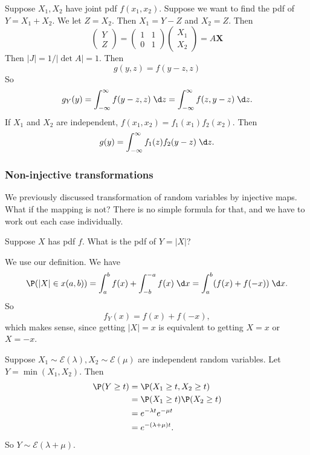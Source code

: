 \documentclass[a4paper]{article}
\begin{document}
\begin{eg}
  Suppose $X_1, X_2$ have joint pdf $f(x_1,x_2)$. Suppose we want to find the pdf of $Y = X_1 + X_2$. We let $Z = X_2$. Then $X_1 = Y - Z$ and $X_2 = Z$. Then
  \[
    \begin{pmatrix}
      Y\\
      Z
    \end{pmatrix} =
    \begin{pmatrix}
      1 & 1 \\
      0 & 1
    \end{pmatrix}
    \begin{pmatrix}
      X_1\\
      X_2
    \end{pmatrix}
    = A\mathbf{X}
  \]
  Then $|J| = 1/|\det A| = 1$. Then
  \[
    g(y, z) = f(y - z, z)
  \]
  So
  \[
    g_Y(y) = \int_{-\infty}^\infty f(y - z, z)\;\d z = \int_{-\infty}^\infty f(z, y - z)\;\d z.
  \]
  If $X_1$ and $X_2$ are independent, $f(x_1, x_2) = f_1(x_1) f_2(x_2)$. Then
  \[
    g(y) = \int_{-\infty}^\infty f_1(z) f_2(y - z)\;\d z.
  \]
\end{eg}

\subsubsection*{Non-injective transformations}
We previously discussed transformation of random variables by injective maps. What if the mapping is not? There is no simple formula for that, and we have to work out each case individually.

\begin{eg}
  Suppose $X$ has pdf $f$. What is the pdf of $Y=|X|$?

  We use our definition. We have
  \[
    \P(|X| \in x(a, b)) = \int_a^b f(x) + \int_{-b}^{-a} f(x)\;\d x = \int_a^b (f(x) + f(-x))\;\d x.
  \]
  So
  \[
    f_Y(x) = f(x) + f(-x),
  \]
  which makes sense, since getting $|X| = x$ is equivalent to getting $X = x$ or $X = -x$.
\end{eg}

\begin{eg}
  Suppose $X_1\sim \mathcal{E}(\lambda), X_2\sim \mathcal{E}(\mu)$ are independent random variables. Let $Y = \min(X_1, X_2)$. Then
  \begin{align*}
    \P(Y \geq t) &= \P(X_1 \geq t, X_2 \geq t)\\
    &= \P(X_1\geq t)\P(X_2 \geq t)\\
    &= e^{-\lambda t}e^{-\mu t}\\
    &= e^{-(\lambda +\mu)t}.
  \end{align*}
  So $Y\sim \mathcal{E}(\lambda + \mu)$.
\end{eg}
\end{document}
